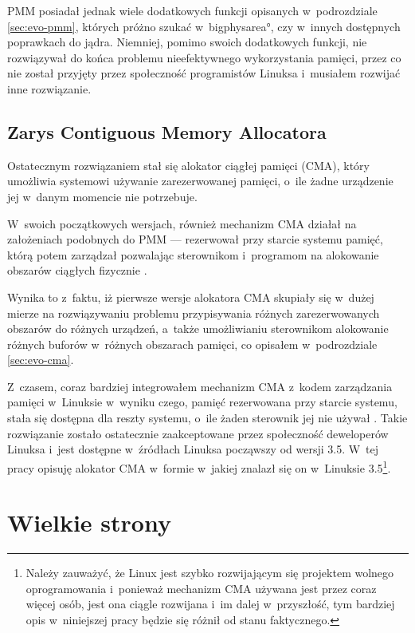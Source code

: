 PMM posiadał jednak wiele dodatkowych funkcji opisanych w~podrozdziale
\ref{sec:evo-pmm}, których próżno szukać w~\ang*{bigphysarea}, czy
w~innych dostępnych poprawkach do jądra.  Niemniej, pomimo swoich
dodatkowych funkcji, nie rozwiązywał do końca problemu nieefektywnego
wykorzystania pamięci, przez co nie został przyjęty przez społeczność
programistów Linuksa i~musiałem rozwijać inne rozwiązanie.

\subsection{Zarys Contiguous Memory Allocatora}

Ostatecznym rozwiązaniem stał się alokator ciągłej pamięci (CMA),
który umożliwia systemowi używanie zarezerwowanej pamięci, o~ile żadne
urządzenie jej w~danym momencie nie potrzebuje.

W~swoich początkowych wersjach, również mechanizm CMA działał na
założeniach podobnych do PMM --- rezerwował przy starcie systemu
pamięć, którą potem zarządzał pozwalając sterownikom i~programom na
alokowanie obszarów ciągłych fizycznie \autocite{patch:cma-1}.

Wynika to z~faktu, iż pierwsze wersje alokatora CMA skupiały się
w~dużej mierze na rozwiązywaniu problemu przypisywania różnych
zarezerwowanych obszarów do różnych urządzeń, a~także umożliwianiu
sterownikom alokowanie różnych buforów w~różnych obszarach pamięci, co
opisałem w~podrozdziale \ref{sec:evo-cma}.

Z~czasem, coraz bardziej integrowałem mechanizm CMA z~kodem
zarządzania pamięci w~Linuksie w~wyniku czego, pamięć rezerwowana przy
starcie systemu, stała się dostępna dla reszty systemu, o~ile żaden
sterownik jej nie używał \autocite{patch:cma-24}.  Takie rozwiązanie
zostało ostatecznie zaakceptowane przez społeczność deweloperów
Linuksa i~jest dostępne w~źródłach Linuksa począwszy od wersji 3.5.
W~tej pracy opisuję alokator CMA w~formie w~jakiej znalazł się on
w~Linuksie 3.5\footnote{Należy zauważyć, że Linux jest szybko
  rozwijającym się projektem wolnego oprogramowania i~ponieważ
  mechanizm CMA używana jest przez coraz więcej osób, jest ona ciągle
  rozwijana i~im dalej w~przyszłość, tym bardziej opis w~niniejszej
  pracy będzie się różnił od stanu faktycznego.}.

\section{Wielkie strony}

